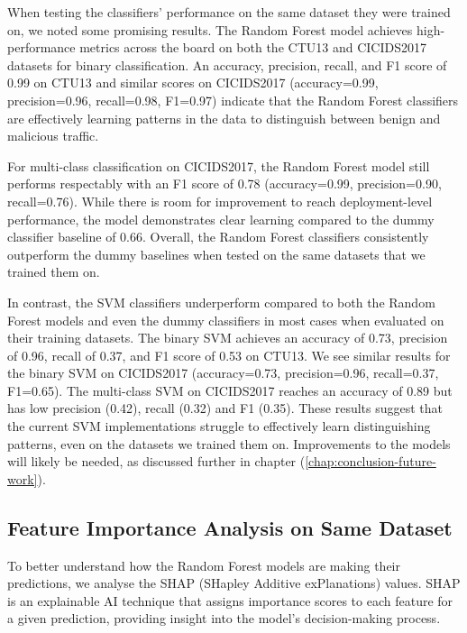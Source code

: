 When testing the classifiers' performance on the same dataset they were trained on, we noted some promising results. The Random Forest model achieves high-performance metrics across the board on both the CTU13 and CICIDS2017 datasets for binary classification. An accuracy, precision, recall, and F1 score of 0.99 on CTU13 and similar scores on CICIDS2017 (accuracy=0.99, precision=0.96, recall=0.98, F1=0.97) indicate that the Random Forest classifiers are effectively learning patterns in the data to distinguish between benign and malicious traffic. 

For multi-class classification on CICIDS2017, the Random Forest model still performs respectably with an F1 score of 0.78 (accuracy=0.99, precision=0.90, recall=0.76). While there is room for improvement to reach deployment-level performance, the model demonstrates clear learning compared to the dummy classifier baseline of 0.66. Overall, the Random Forest classifiers consistently outperform the dummy baselines when tested on the same datasets that we trained them on.

In contrast, the SVM classifiers underperform compared to both the Random Forest models and even the dummy classifiers in most cases when evaluated on their training datasets. The binary SVM achieves an accuracy of 0.73, precision of 0.96, recall of 0.37, and F1 score of 0.53 on CTU13. We see similar results for the binary SVM on CICIDS2017 (accuracy=0.73, precision=0.96, recall=0.37, F1=0.65). The multi-class SVM on CICIDS2017 reaches an accuracy of 0.89 but has low precision (0.42), recall (0.32) and F1 (0.35). These results suggest that the current SVM implementations struggle to effectively learn distinguishing patterns, even on the datasets we trained them on. Improvements to the models will likely be needed, as discussed further in chapter (\ref{chap:conclusion-future-work}).

\subsection{Feature Importance Analysis on Same Dataset}\label{subsec:feature-importance-analysis-same-dataset}

To better understand how the Random Forest models are making their predictions, we analyse the SHAP (SHapley Additive exPlanations) values. SHAP is an explainable AI technique that assigns importance scores to each feature for a given prediction, providing insight into the model's decision-making process.

